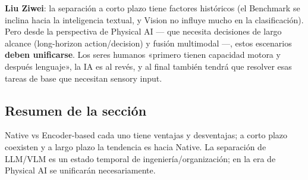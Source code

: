 \textbf{Liu Ziwei}: la separación a corto plazo tiene factores históricos (el Benchmark se inclina hacia la inteligencia textual, y Vision no influye mucho en la clasificación). Pero desde la perspectiva de Physical AI — que necesita decisiones de largo alcance (long-horizon action/decision) y fusión multimodal —, estos escenarios \textbf{deben unificarse}. Los seres humanos «primero tienen capacidad motora y después lenguaje», la IA es al revés, y al final también tendrá que resolver esas tareas de base que necesitan sensory input.

\subsection{Resumen de la sección}
Native vs Encoder-based cada uno tiene ventajas y desventajas; a corto plazo coexisten y a largo plazo la tendencia es hacia Native. La separación de LLM/VLM es un estado temporal de ingeniería/organización; en la era de Physical AI se unificarán necesariamente.

